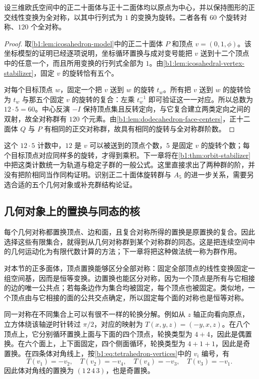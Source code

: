 \begin{proposition}[正二十面体与正十二面体的对称群阶数]\label{b1:prop:icosahedral-order}
	设三维欧氏空间中的正二十面体与正十二面体均以原点为中心，并以保持图形的正交线性变换为全对称，以其中行列式为 \(1\) 的变换为旋转。二者各有 \(60\) 个旋转对称、\(120\) 个全对称。
\end{proposition}
\begin{proof}
	取\cref{b1:lem:icosahedron-model}中的正二十面体 \(P\) 和顶点 \(v=(0,1,\phi)\)。该坐标模型的证明已经逐项说明，坐标循环置换与成对变号能把 \(v\) 送到十二个顶点中的任意一个，而且所用变换的行列式全部为 \(1\)。由\cref{b1:lem:icosahedral-vertex-stabilizer}，固定 \(v\) 的旋转恰有五个。

	对每个目标顶点 \(w\)，固定一个把 \(v\) 送到 \(w\) 的旋转 \(t_w\)。所有把 \(v\) 送到 \(w\) 的旋转恰为 \(t_w\) 与那五个固定 \(v\) 的旋转的复合：左乘 \(t_w^{-1}\) 即可验证这一一对应。所以总数为 \(12\cdot5=60\)。中心反演 \(-I\) 保持顶点集且反转定向，与它复合建立两类定向之间的双射，故全对称群有 \(120\) 个元素。由\cref{b1:lem:dodecahedron-face-centers}，正十二面体 \(Q\) 与 \(P\) 有相同的正交对称群，故具有相同的旋转与全对称群阶数。
\end{proof}

这个 \(12\cdot5\) 计数中，\(12\) 是 \(v\) 可以被送到的顶点个数，\(5\) 是固定 \(v\) 的旋转个数；每个目标顶点对应同样多的旋转，才得到乘积。下一章将在\cref{b1:thm:orbit-stabilizer}中把这类计数统一为轨道与稳定子群的一般公式。这里直接求出了两种群的阶，并没有把阶相同当作同构证明。识别正二十面体旋转群与 \(A_5\) 的进一步关系，需要另选合适的五个几何对象或补充群结构论证。

\subsection{几何对象上的置换与同态的核}
\label{b1:subsec:0304:02}

每个几何对称都置换顶点、边和面，且复合对称所得的置换是原置换的复合。因此选择这些有限集合，就得到从几何对称群到某个对称群的同态。这是把连续空间中的几何运动化为有限代数计算的方法；下一章将把这种做法统一称为群作用。

\ProseParagraphBreak
对本节的正多面体，顶点置换能够区分全部对称：固定全部顶点的线性变换固定一组空间基，因而是恒等变换。边置换也能区分对称，因为一个顶点是所有与它相接的边的唯一公共点；若每条边作为集合均被固定，每个顶点也被固定。类似地，一个顶点由与它相接的面的公共交点确定，所以固定每个面的对称也是恒等对称。

\ProseParagraphBreak
同一对称在不同集合上可以有很不一样的轮换分解。例如从 \(z\) 轴正向看向原点，立方体绕该轴逆时针转过 \(\pi/2\)，对应的映射为 \(T(x,y,z)=(-y,x,z)\)。在八个顶点上，它分别循环置换上面与下面的四个顶点，轮换类型为 \(4+4\)，因此是偶置换。在六个面上，上下面固定，四个侧面循环，轮换类型为 \(4+1+1\)，因此是奇置换。在四条体对角线上，按\eqref{b1:eq:tetrahedron-vertices}中的 \(v_i\) 编号，有
\[
	T(v_1)=-v_2,\quad T(v_2)=-v_4,\quad T(v_4)=-v_3,\quad T(v_3)=-v_1.
\]
因此体对角线的置换为 \((1\,2\,4\,3)\)，也是奇置换。

